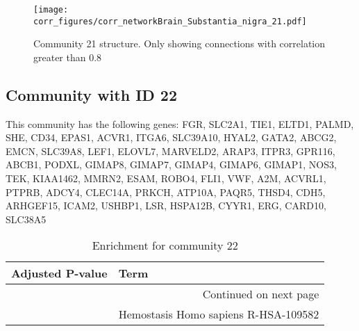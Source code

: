 \begin{figure}[h!]
\centering
\texttt{[image: corr\_figures/corr\_networkBrain\_Substantia\_nigra\_21.pdf]}
\caption{Community 21 structure. Only showing connections with correlation greater than 0.8}
\end{figure}




\subsection*{Community with ID 22}
This community has the following genes: FGR, SLC2A1, TIE1, ELTD1, PALMD, SHE, CD34, EPAS1, ACVR1, ITGA6, SLC39A10, HYAL2, GATA2, ABCG2, EMCN, SLC39A8, LEF1, ELOVL7, MARVELD2, ARAP3, ITPR3, GPR116, ABCB1, PODXL, GIMAP8, GIMAP7, GIMAP4, GIMAP6, GIMAP1, NOS3, TEK, KIAA1462, MMRN2, ESAM, ROBO4, FLI1, VWF, A2M, ACVRL1, PTPRB, ADCY4, CLEC14A, PRKCH, ATP10A, PAQR5, THSD4, CDH5, ARHGEF15, ICAM2, USHBP1, LSR, HSPA12B, CYYR1, ERG, CARD10, SLC38A5
\\
\begin{longtable}{p{2.4cm}p{14.5cm}}
\caption{Enrichment for community 22}\\
\toprule
Adjusted \newline P-value &                                  Term \\
\midrule
\endhead
\midrule
\multicolumn{2}{r}{{Continued on next page}} \\
\midrule
\endfoot

\bottomrule
\endlastfoot
                 0.004112 &  Hemostasis Homo sapiens R-HSA-109582 \\
\end{longtable}


